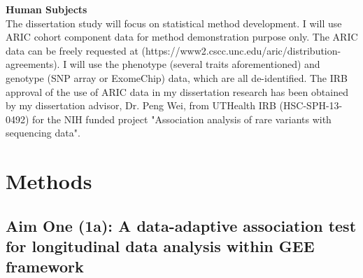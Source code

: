 \documentclass[12pt]{article}
\begin{document}
\textbf{Human Subjects}\\
The dissertation study will focus on statistical method development. I will use ARIC cohort component data for method demonstration purpose only. The ARIC data can be freely requested at (https://www2.cscc.unc.edu/aric/distribution-agreements). I will use the phenotype (several traits aforementioned) and genotype (SNP array or ExomeChip) data, which are all de-identified. The IRB approval of the use of ARIC data in my dissertation research has been obtained by my dissertation advisor, Dr. Peng Wei, from UTHealth IRB (HSC-SPH-13-0492) for the NIH funded project "Association analysis of rare variants with sequencing data".


\section{Methods}\label{sec:method}
\subsection{Aim One (1a): A data-adaptive association test for longitudinal data analysis within GEE framework}\label{sec:subsec1}

\end{document}
